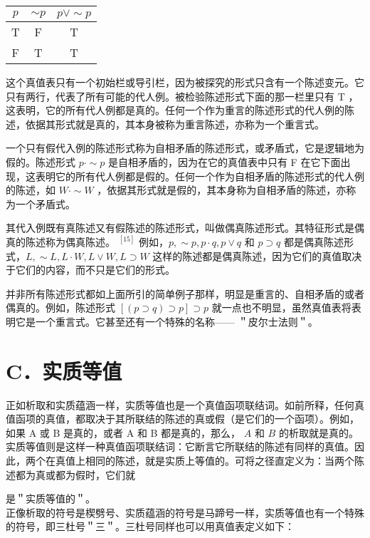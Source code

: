 \begin{center}
\begin{tabular}{|ccc|}
\hline
$p$ & $\sim p$ & $p \vee \sim p$ \\
\hline
T & F & T \\
F & T & T \\
\hline
\end{tabular}
\end{center}

这个真值表只有一个初始栏或导引栏，因为被探究的形式只含有一个陈述变元。它只有两行，代表了所有可能的代人例。被检验陈述形式下面的那一栏里只有 T ，这表明，它的所有代人例都是真的。任何一个作为重言的陈述形式的代人例的陈述，依据其形式就是真的，其本身被称为重言陈述，亦称为一个重言式。

一个只有假代入例的陈述形式称为自相矛盾的陈述形式，或矛盾式，它是逻辑地为假的。陈述形式 $p \cdot \sim p$ 是自相矛盾的，因为在它的真值表中只有 F 在它下面出现，这表明它的所有代人例都是假的。任何一个作为自相矛盾的陈述形式的代人例的陈述，如 $W \cdot \sim W$ ，依据其形式就是假的，其本身称为自相矛盾的陈述，亦称为一个矛盾式。

其代入例既有真陈述又有假陈述的陈述形式，叫做偶真陈述形式。其特征形式是偶真的陈述称为偶真陈述。 ${ }^{[15]}$ 例如，$p, \sim p, p \cdot q, p \vee q$ 和 $p \supset q$ 都是偶真陈述形式，$L, \sim L, L \cdot W, L \vee W, L \supset W$ 这样的陈述都是偶真陈述，因为它们的真值取决于它们的内容，而不只是它们的形式。

并非所有陈述形式都如上面所引的简单例子那样，明显是重言的、自相矛盾的或者偶真的。例如，陈述形式 $[(p \supset q) \supset p] \supset p$ 就一点也不明显，虽然真值表将表明它是一个重言式。它甚至还有一个特殊的名称—— ＂皮尔士法则＂。

\section*{C．实质等值}
正如析取和实质蕴涵一样，实质等值也是一个真值函项联结词。如前所释，任何真值函项的真值，都取决于其所联结的陈述的真或假（是它们的一个函项）。例如，如果 A 或 B 是真的，或者 A 和 B 都是真的，那么， $A$ 和 $B$ 的析取就是真的。实质等值则是这样一种真值函项联结词：它断言它所联结的陈述有同样的真值。因此，两个在真值上相同的陈述，就是实质上等值的。可将之径直定义为：当两个陈述都为真或都为假时，它们就

是＂实质等值的＂。\\
正像析取的符号是楔劈号、实质蕴涵的符号是马蹄号一样，实质等值也有一个特殊的符号，即三杜号＂三＂。三杜号同样也可以用真值表定义如下：


